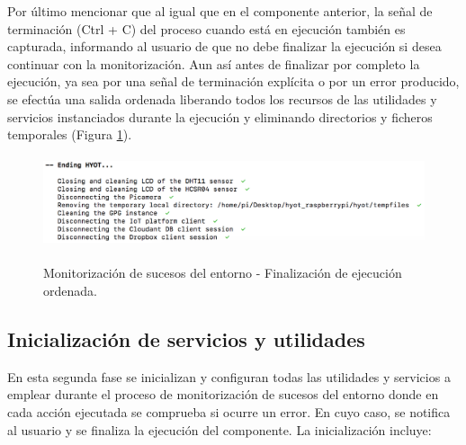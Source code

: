 \documentclass[12pt,a4paper, twoside]{report}
\begin{document}
	Por último mencionar que al igual que en el componente anterior, la señal de terminación (Ctrl + C) del proceso cuando está en ejecución también es capturada, informando al usuario de que no debe finalizar la ejecución si desea continuar con la monitorización. Aun así antes de finalizar por completo la ejecución, ya sea por una señal de terminación explícita o por un error producido, se efectúa una salida ordenada liberando todos los recursos de las utilidades y servicios instanciados durante la ejecución y eliminando directorios y ficheros temporales (Figura \ref{fig:userguide_monitoring_exit}).

	\begin{figure}[!ht]   
		\caption{Monitorización de sucesos del entorno - Finalización de ejecución ordenada.} 
		\begin{center} 
			\includegraphics[width=14cm,height=2.7cm]{Images/userGuide/monitoring/exit} \\
			\label{fig:userguide_monitoring_exit} 
		\end{center}  
	\end{figure}

	 \subsection{Inicialización de servicios y utilidades}
	 
	 En esta segunda fase se inicializan y configuran todas las utilidades y servicios a emplear durante el proceso de monitorización de sucesos del entorno donde en cada acción ejecutada se comprueba si ocurre un error. En cuyo caso, se notifica al usuario y se finaliza la ejecución del componente. La inicialización incluye:
	 
\end{document}
